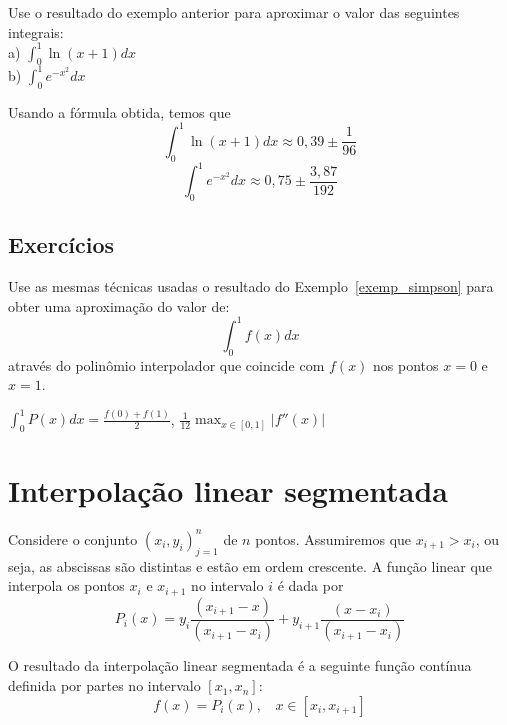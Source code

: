 \begin{ex}
Use o resultado do exemplo anterior para aproximar o valor das seguintes integrais:\\

a) $\displaystyle \int_0^1 \ln(x+1) dx$\\

b) $\displaystyle \int_0^1 e^{-x^2}dx$

\end{ex}
\begin{sol}
Usando a fórmula obtida, temos que
$$
\int_0^1\ln(x+1) dx \approx 0,39\pm \frac{1}{96}
$$
$$
\int_0^1 e^{-x^2} dx \approx 0,75\pm \frac{3,87}{192}
$$
\end{sol}

\subsection*{Exercícios}

\begin{exer}
  Use as mesmas técnicas usadas o resultado do Exemplo~\ref{exemp_simpson} para obter uma aproximação do valor de:
  \begin{equation*}
    \int_0^1 f(x)dx
  \end{equation*}
através do polinômio interpolador que coincide com $f(x)$ nos pontos $x=0$ e $x=1$.
\end{exer}
\begin{resp}

  $\int_0^1 P(x)dx =\frac{f(0)+f(1)}{2}$, $\frac{1}{12}\max_{x\in[0,1]}|f''(x)|$

\end{resp}

\section{Interpolação linear segmentada}
Considere o conjunto $\left(x_i,y_i\right)_{j=1}^n$ de $n$ pontos. Assumiremos que $x_{i+1}>x_i$, ou seja, as abscissas são distintas e estão em ordem crescente. A função linear que interpola os pontos $x_i$ e $x_{i+1}$ no intervalo $i$ é dada por
$$P_i(x)=y_i \frac{(x_{i+1}-x)}{(x_{i+1}-x_i)} + y_{i+1} \frac{(x-x_i)}{(x_{i+1}-x_i)}$$

O resultado da interpolação linear segmentada é a seguinte função contínua definida por partes no intervalo $[x_1,x_n]$:
$$f(x)=P_i(x), ~~~~ x\in [x_i,x_{i+1}]$$


